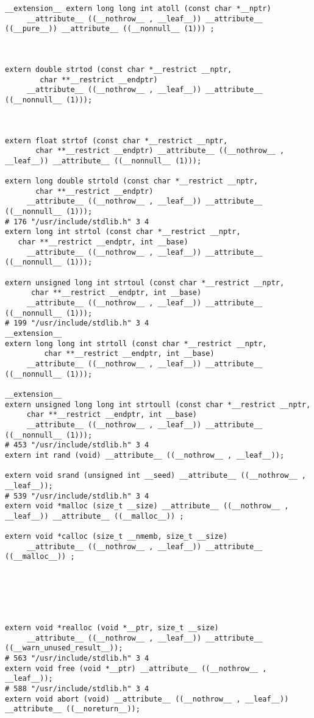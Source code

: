 \documentclass[11pt]{article}
\begin{document}
\begin{enumerate}
\begin{verbatim}
__extension__ extern long long int atoll (const char *__nptr)
     __attribute__ ((__nothrow__ , __leaf__)) __attribute__ ((__pure__)) __attribute__ ((__nonnull__ (1))) ;



extern double strtod (const char *__restrict __nptr,
        char **__restrict __endptr)
     __attribute__ ((__nothrow__ , __leaf__)) __attribute__ ((__nonnull__ (1)));



extern float strtof (const char *__restrict __nptr,
       char **__restrict __endptr) __attribute__ ((__nothrow__ , __leaf__)) __attribute__ ((__nonnull__ (1)));

extern long double strtold (const char *__restrict __nptr,
       char **__restrict __endptr)
     __attribute__ ((__nothrow__ , __leaf__)) __attribute__ ((__nonnull__ (1)));
# 176 "/usr/include/stdlib.h" 3 4
extern long int strtol (const char *__restrict __nptr,
   char **__restrict __endptr, int __base)
     __attribute__ ((__nothrow__ , __leaf__)) __attribute__ ((__nonnull__ (1)));

extern unsigned long int strtoul (const char *__restrict __nptr,
      char **__restrict __endptr, int __base)
     __attribute__ ((__nothrow__ , __leaf__)) __attribute__ ((__nonnull__ (1)));
# 199 "/usr/include/stdlib.h" 3 4
__extension__
extern long long int strtoll (const char *__restrict __nptr,
         char **__restrict __endptr, int __base)
     __attribute__ ((__nothrow__ , __leaf__)) __attribute__ ((__nonnull__ (1)));

__extension__
extern unsigned long long int strtoull (const char *__restrict __nptr,
     char **__restrict __endptr, int __base)
     __attribute__ ((__nothrow__ , __leaf__)) __attribute__ ((__nonnull__ (1)));
# 453 "/usr/include/stdlib.h" 3 4
extern int rand (void) __attribute__ ((__nothrow__ , __leaf__));

extern void srand (unsigned int __seed) __attribute__ ((__nothrow__ , __leaf__));
# 539 "/usr/include/stdlib.h" 3 4
extern void *malloc (size_t __size) __attribute__ ((__nothrow__ , __leaf__)) __attribute__ ((__malloc__)) ;

extern void *calloc (size_t __nmemb, size_t __size)
     __attribute__ ((__nothrow__ , __leaf__)) __attribute__ ((__malloc__)) ;






extern void *realloc (void *__ptr, size_t __size)
     __attribute__ ((__nothrow__ , __leaf__)) __attribute__ ((__warn_unused_result__));
# 563 "/usr/include/stdlib.h" 3 4
extern void free (void *__ptr) __attribute__ ((__nothrow__ , __leaf__));
# 588 "/usr/include/stdlib.h" 3 4
extern void abort (void) __attribute__ ((__nothrow__ , __leaf__)) __attribute__ ((__noreturn__));




\end{verbatim}
\end{enumerate}
\end{document}
